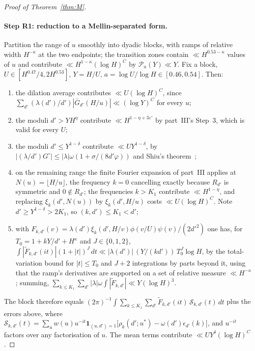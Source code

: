 \documentclass[11pt,a4paper]{article}
\begin{document}
\begin{proof}[Proof of Theorem~\ref{thm:M}]
\paragraph{Step R1: reduction to a Mellin-separated form.} Partition the range of $u$ smoothly into dyadic blocks, with ramps of relative width $H^{-\kappa}$ at the two endpoints;
the transition zones contain $\ll H^{0.53-\kappa}$ values of $u$ and contribute $\ll H^{1-\kappa}(\log H)^C$ by $\mathcal P_u(Y)\ll Y$. Fix a block, $U\in[H^{0.47}/4,2H^{0.53}]$,
$Y=H/U$, $a=\log U/\log H\in[0.46,0.54]$. Then:
\begin{enumerate}
\item[(a)] the dilation average contributes $\ll U(\log H)^C$, since $\sum_{d'}(\lambda(d')/d')|\bar G_{d'}(H/u)|\ll(\log Y)^C$ for every $u$;
\item[(b)] the moduli $d'>YH^{\eta}$ contribute $\ll H^{1-\eta+3\varepsilon'}$ by part~III's Step~3, which is valid for every $U$;
\item[(c)] the moduli $d'\le Y^{1-\delta}$ contribute $\ll UY^{1-\delta}$, by $|(\lambda/d')G^\circ|\le|\lambda|\omega(1+\sigma/(8d'\varphi))$ and Shiu's theorem~\cite{Shiu1980};
\item[(d)] on the remaining range the finite Fourier expansion of part~III applies at $N(u)=\lfloor H/u\rfloor$, the frequency $k=0$ cancelling exactly because $R_{d'}$ is symmetric
and $0\notin R_{d'}$; the frequencies $k>K_1$ contribute $\ll H^{1-\eta}$, and replacing $\xi_k(d',N(u))$ by $\xi_k(d',H/u)$ costs $\ll U(\log H)^C$. Note $d'\ge Y^{1-\delta}>2K_1$,
so $(k,d')\le K_1<d'$;
\item[(e)] with $F_{k,d'}(v)=\lambda(d')\xi_k(d',H/v)\phi(v/U)\psi(v)/(2d'^2)$ one has, for $T_0=1+kY/d'+H^{\kappa}$ and $J\in\{0,1,2\}$,
$\int|\widetilde F_{k,d'}(it)|(1+|t|)^J\,dt\ll|\lambda(d')|\,(Y/(kd'))\,T_0^J\log H$, by the total-variation bound for $|t|\le T_0$ and $J+2$ integrations by parts beyond it, using
that the ramp's derivatives are supported on a set of relative measure $\ll H^{-\kappa}$; summing, $\sum_{k\le K_1}\sum_{d'}|\lambda|\omega\int|\widetilde F_{k,d'}|\ll Y(\log H)^3$.
\end{enumerate}
The block therefore equals $(2\pi)^{-1}\int\sum_{k\le K_1}\sum_{d'}\widetilde F_{k,d'}(it)\,\mathcal S_{k,d'}(t)\,dt$ plus the errors above, where
$\mathcal S_{k,d'}(t)=\sum_uw(u)u^{-it}\mathbf 1_{(u,d')=1}\bigl[\rho_k(d';u^\ast)-\omega(d')\epsilon_{d'}(k)\bigr]$, and $u^{-it}$ factors over any factorisation of $u$. The mean
terms contribute $\ll UY^{\delta}(\log H)^C$.


\end{proof}
\end{document}
